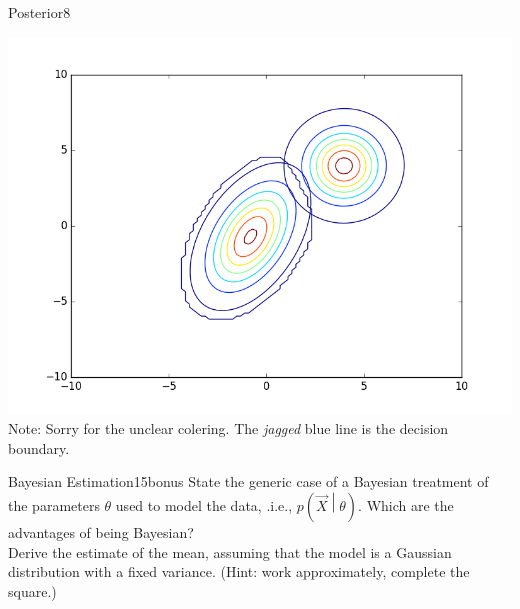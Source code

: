 \begin{questions}
\begin{question}{Posterior}{8}
\begin{answer}
\centering \includegraphics[width=1.0\linewidth]{dataSets/2-2-e}\label{fig:decisionboundary} \\
Note: Sorry for the unclear colering. The \emph{jagged} blue line is the decision boundary.
\end{answer}

\end{question}


\begin{question}{Bayesian Estimation}{15}{bonus}
State the generic case of a Bayesian treatment of the parameters $\theta$ used to model the data, .i.e., $p(\vec X \middle | \theta )$. 
Which are the advantages of being Bayesian? 
\\ Derive the estimate of the mean, assuming that the model is a Gaussian distribution with a fixed variance. (Hint: work approximately, complete the square.)


\begin{answer}
\end{answer}

\end{question}

\end{questions}
